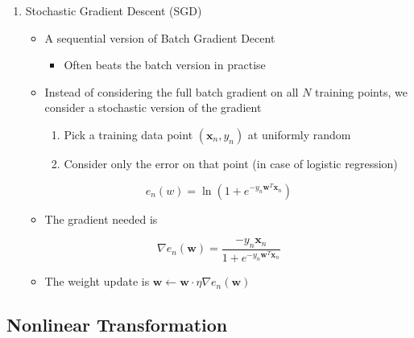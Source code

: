\documentclass[11pt]{article}
\begin{document}
\begin{enumerate}
\item Stochastic Gradient Descent (SGD)
\label{sec:org6a094de}
\begin{itemize}
\item A sequential version of Batch Gradient Decent
\begin{itemize}
\item Often beats the batch version in practise
\end{itemize}

\item Instead of considering the full batch gradient on all \(N\) training points, we consider a stochastic version of the gradient
\begin{enumerate}
\item Pick a training data point \((\pmb x_n, y_n)\) at uniformly random
\item Consider only the error on that point (in case of logistic regression)
\end{enumerate}
\end{itemize}
\begin{equation}
   e_n(w) = \ln ( 1+ e^{-y_n \pmb w^T \pmb x_n})
\end{equation}

\begin{itemize}
\item The gradient needed is
\end{itemize}
\begin{equation}
  \nabla e_n (\pmb w) = \frac{-y_n\pmb x_n}{1+e^{-y_n \pmb w^T \pmb x_n}}
\end{equation}
\begin{itemize}
\item The weight update is \(\pmb w \leftarrow \pmb w \cdot \eta \nabla e_n(\pmb w)\)
\end{itemize}
\end{enumerate}

\subsection{Nonlinear Transformation}
\label{sec:org593ac5f}
\end{document}
